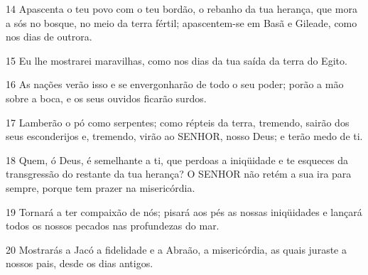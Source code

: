 \par 14 Apascenta o teu povo com o teu bordão, o rebanho da tua herança, que mora a sós no bosque, no meio da terra fértil; apascentem-se em Basã e Gileade, como nos dias de outrora.
\par 15 Eu lhe mostrarei maravilhas, como nos dias da tua saída da terra do Egito.
\par 16 As nações verão isso e se envergonharão de todo o seu poder; porão a mão sobre a boca, e os seus ouvidos ficarão surdos.
\par 17 Lamberão o pó como serpentes; como répteis da terra, tremendo, sairão dos seus esconderijos e, tremendo, virão ao SENHOR, nosso Deus; e terão medo de ti.
\par 18 Quem, ó Deus, é semelhante a ti, que perdoas a iniqüidade e te esqueces da transgressão do restante da tua herança? O SENHOR não retém a sua ira para sempre, porque tem prazer na misericórdia.
\par 19 Tornará a ter compaixão de nós; pisará aos pés as nossas iniqüidades e lançará todos os nossos pecados nas profundezas do mar.
\par 20 Mostrarás a Jacó a fidelidade e a Abraão, a misericórdia, as quais juraste a nossos pais, desde os dias antigos.


